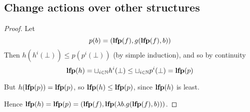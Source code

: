 \subsection{Change actions over other structures}

\factoringFixpoints*
\begin{proof}
  \label{prf:factoringFixpoints}
  Let
  \begin{displaymath}
    p(b) = (\mathbf{lfp}(f), g(\mathbf{lfp}(f), b))
  \end{displaymath}
  Then $h(h^i(\bot)) \leq p(p^i(\bot))$ (by simple induction), and so by continuity
  \begin{displaymath}
    \mathbf{lfp}(h) = \sqcup_{i \in \mathbb{N}} h^i(\bot) \leq \sqcup_{i \in \mathbb{N}} p^i(\bot) = \mathbf{lfp}(p)
  \end{displaymath}

  But $h(\mathbf{lfp}(p)) = \mathbf{lfp}(p)$, so $\mathbf{lfp}(h) \leq \mathbf{lfp}(p)$, since $\mathbf{lfp}(h)$ is least.

  Hence $\mathbf{lfp}(h) = \mathbf{lfp}(p) = (\mathbf{lfp}(f), \mathbf{lfp}(\lambda b . g(\mathbf{lfp}(f), b)))$.
\end{proof}

